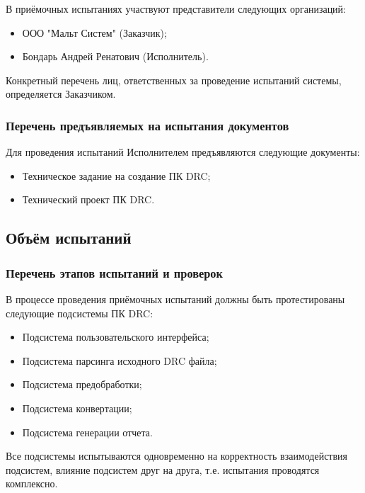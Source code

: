 В приёмочных испытаниях участвуют представители следующих организаций:

\begin{itemize}
	\item ООО "Мальт Систем" (Заказчик);
	\item Бондарь Андрей Ренатович (Исполнитель).
\end{itemize}

Конкретный перечень лиц, ответственных за проведение испытаний системы,
определяется Заказчиком.

\subsubsection{Перечень предъявляемых на испытания документов}

Для проведения испытаний Исполнителем предъявляются следующие документы:

\begin{itemize}
	\item Техническое задание на создание ПК DRC;
	\item Технический проект ПК DRC.
\end{itemize}

\subsection{Объём испытаний}

\subsubsection{Перечень этапов испытаний и проверок}

В процессе проведения приёмочных испытаний должны
быть протестированы следующие подсистемы ПК DRC:

\begin{itemize}
	\item Подсистема пользовательского интерфейса;
	\item Подсистема парсинга исходного DRC файла;
	\item Подсистема предобработки;
	\item Подсистема конвертации;
	\item Подсистема генерации отчета.
\end{itemize}

Все подсистемы испытываются одновременно
на корректность взаимодействия подсистем,
влияние подсистем друг на друга, т.е. испытания проводятся комплексно.

